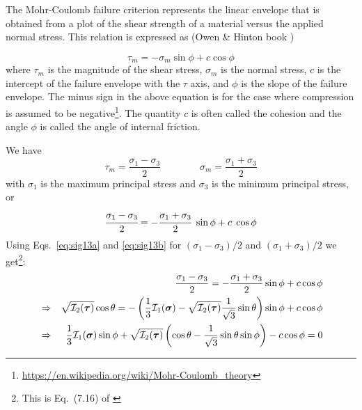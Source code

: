 The Mohr-Coulomb failure criterion represents the linear envelope that is obtained 
from a plot of the shear strength of a material 
versus the applied normal stress. This relation is expressed as (Owen \& Hinton book \cite[p219]{owhi})



\begin{equation}
\tau_m = -\sigma_m \sin \phi + c \cos \phi  \label{eq:mccrit}
\end{equation}
where $\tau_m$ is the magnitude of the shear stress, 
$\sigma_m$ is the normal stress, $c$ is the intercept of the failure envelope with the $\tau$ axis, 
and $\phi$ is the slope of the failure envelope.
The minus sign in the above equation is for the case where compression is assumed to be 
negative\footnote{\url{https://en.wikipedia.org/wiki/Mohr-Coulomb_theory}}.
The quantity $c$ is often called the cohesion and the angle $\phi$ is called the angle of internal friction.
 
We have  
\[
\tau_m=\frac{\sigma_1-\sigma_3}{2}
\qquad
\qquad
\sigma_m = \frac{\sigma_1+\sigma_3}{2}
\]
with $\sigma_1$ is the maximum principal stress and $\sigma_3$ is the minimum principal stress, or
\begin{equation}
\cfrac{\sigma_1-\sigma_3}{2} = -\cfrac{\sigma_1+\sigma_3}{2}~\sin\phi +c\; \cos\phi 
\end{equation}
Using Eqs.~\eqref{eq:sig13a} and \eqref{eq:sig13b} 
for $(\sigma_1 - \sigma_3 )/2$ and $(\sigma_1 + \sigma_3 )/2$ we get\footnote{This is 
Eq.~(7.16) of \textcite{owhi}}:
\begin{eqnarray}
&& \frac{\sigma_1 - \sigma_3}{2} = -\frac{\sigma_1 + \sigma_3}{2} \sin \phi  + c \cos \phi \nonumber\\
&\Rightarrow&
\sqrt{  {\cal I}_2({\bm \tau}) } \cos \theta = -\left(\frac{1}{3}{\cal I}_1({\bm \sigma}) - \sqrt{  {\cal I}_2({\bm \tau})} \frac{1}{\sqrt{3}} \sin \theta \right) \sin \phi 
+ c \cos \phi \nonumber\\
&\Rightarrow&
\frac{1}{3} {\cal I}_1({\bm \sigma}) \sin \phi  
+ \sqrt{  {\cal I}_2({\bm \tau}) } \left( \cos \theta - \frac{1}{\sqrt{3}} \sin \theta  \sin \phi \right) - c \cos \phi = 0 \nonumber
\end{eqnarray}

